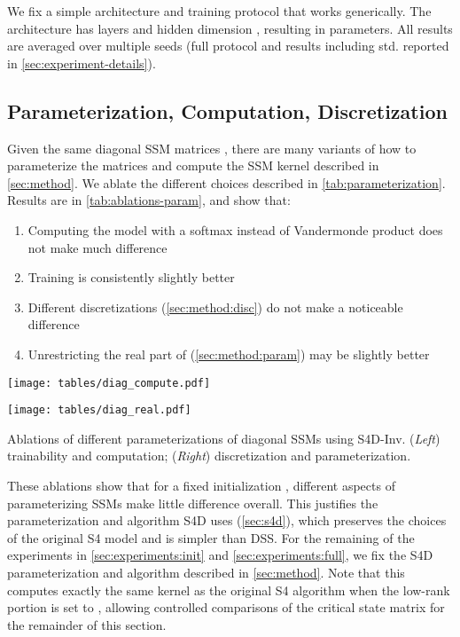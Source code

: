 \documentclass{article}
\begin{document}
We fix a simple architecture and training protocol that works generically.
The architecture has  layers and hidden dimension , resulting in  parameters.
All results are averaged over multiple seeds (full protocol and results including std. reported in \cref{sec:experiment-details}).


\subsection{Parameterization, Computation, Discretization}
\label{sec:experiments:diag}





Given the same diagonal SSM matrices , there are many variants of how to parameterize the matrices and compute the SSM kernel described in \cref{sec:method}.
We ablate the different choices described in \cref{tab:parameterization}.
Results are in \cref{tab:ablations-param}, and show that:
\begin{enumerate}[label=(\roman*),leftmargin=*]\item Computing the model with a softmax instead of Vandermonde product does not make much difference
  \item Training  is consistently slightly better
  \item Different discretizations (\cref{sec:method:disc}) do not make a noticeable difference
  \item Unrestricting the real part of  (\cref{sec:method:param}) may be slightly better
\end{enumerate}


\begin{table}[!t]
  \begin{minipage}{.5\linewidth}\centering
    \texttt{[image: tables/diag\_compute.pdf]}
  \end{minipage}
  \begin{minipage}{.5\linewidth}\centering
    \texttt{[image: tables/diag\_real.pdf]}
  \end{minipage}
  \caption{
    Ablations of different parameterizations of diagonal SSMs using S4D-Inv.
    (\emph{Left}) trainability and computation;
    (\emph{Right}) discretization and parameterization.
  }
  \label{tab:ablations-param}
\end{table}

These ablations show that for a fixed initialization , different aspects of parameterizing SSMs make little difference overall.
This justifies the parameterization and algorithm S4D uses (\cref{sec:s4d}), which preserves the choices of the original S4 model and is simpler than DSS.
For the remaining of the experiments in \cref{sec:experiments:init} and \cref{sec:experiments:full},
we fix the S4D parameterization and algorithm described in \cref{sec:method}.
Note that this computes exactly the same kernel as the original S4 algorithm when the low-rank portion is set to ,
allowing controlled comparisons of the critical state matrix  for the remainder of this section.
\end{document}
